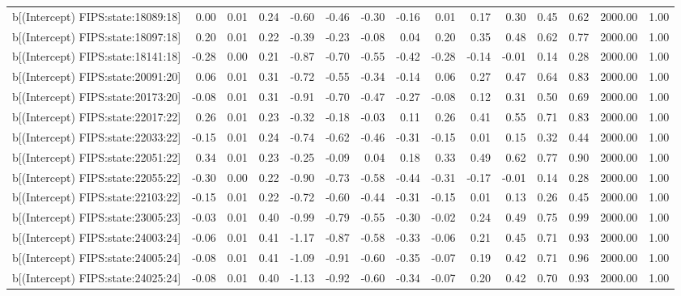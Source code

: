 \begin{table}[ht]
\begin{tabular}{rrrrrrrrrrrrrrr}
  b[(Intercept) FIPS:state:18089:18] & 0.00 & 0.01 & 0.24 & -0.60 & -0.46 & -0.30 & -0.16 & 0.01 & 0.17 & 0.30 & 0.45 & 0.62 & 2000.00 & 1.00 \\ 
  b[(Intercept) FIPS:state:18097:18] & 0.20 & 0.01 & 0.22 & -0.39 & -0.23 & -0.08 & 0.04 & 0.20 & 0.35 & 0.48 & 0.62 & 0.77 & 2000.00 & 1.00 \\ 
  b[(Intercept) FIPS:state:18141:18] & -0.28 & 0.00 & 0.21 & -0.87 & -0.70 & -0.55 & -0.42 & -0.28 & -0.14 & -0.01 & 0.14 & 0.28 & 2000.00 & 1.00 \\ 
  b[(Intercept) FIPS:state:20091:20] & 0.06 & 0.01 & 0.31 & -0.72 & -0.55 & -0.34 & -0.14 & 0.06 & 0.27 & 0.47 & 0.64 & 0.83 & 2000.00 & 1.00 \\ 
  b[(Intercept) FIPS:state:20173:20] & -0.08 & 0.01 & 0.31 & -0.91 & -0.70 & -0.47 & -0.27 & -0.08 & 0.12 & 0.31 & 0.50 & 0.69 & 2000.00 & 1.00 \\ 
  b[(Intercept) FIPS:state:22017:22] & 0.26 & 0.01 & 0.23 & -0.32 & -0.18 & -0.03 & 0.11 & 0.26 & 0.41 & 0.55 & 0.71 & 0.83 & 2000.00 & 1.00 \\ 
  b[(Intercept) FIPS:state:22033:22] & -0.15 & 0.01 & 0.24 & -0.74 & -0.62 & -0.46 & -0.31 & -0.15 & 0.01 & 0.15 & 0.32 & 0.44 & 2000.00 & 1.00 \\ 
  b[(Intercept) FIPS:state:22051:22] & 0.34 & 0.01 & 0.23 & -0.25 & -0.09 & 0.04 & 0.18 & 0.33 & 0.49 & 0.62 & 0.77 & 0.90 & 2000.00 & 1.00 \\ 
  b[(Intercept) FIPS:state:22055:22] & -0.30 & 0.00 & 0.22 & -0.90 & -0.73 & -0.58 & -0.44 & -0.31 & -0.17 & -0.01 & 0.14 & 0.28 & 2000.00 & 1.00 \\ 
  b[(Intercept) FIPS:state:22103:22] & -0.15 & 0.01 & 0.22 & -0.72 & -0.60 & -0.44 & -0.31 & -0.15 & 0.01 & 0.13 & 0.26 & 0.45 & 2000.00 & 1.00 \\ 
  b[(Intercept) FIPS:state:23005:23] & -0.03 & 0.01 & 0.40 & -0.99 & -0.79 & -0.55 & -0.30 & -0.02 & 0.24 & 0.49 & 0.75 & 0.99 & 2000.00 & 1.00 \\ 
  b[(Intercept) FIPS:state:24003:24] & -0.06 & 0.01 & 0.41 & -1.17 & -0.87 & -0.58 & -0.33 & -0.06 & 0.21 & 0.45 & 0.71 & 0.93 & 2000.00 & 1.00 \\ 
  b[(Intercept) FIPS:state:24005:24] & -0.08 & 0.01 & 0.41 & -1.09 & -0.91 & -0.60 & -0.35 & -0.07 & 0.19 & 0.42 & 0.71 & 0.96 & 2000.00 & 1.00 \\ 
  b[(Intercept) FIPS:state:24025:24] & -0.08 & 0.01 & 0.40 & -1.13 & -0.92 & -0.60 & -0.34 & -0.07 & 0.20 & 0.42 & 0.70 & 0.93 & 2000.00 & 1.00 \\ 

\end{tabular}
\end{table}
